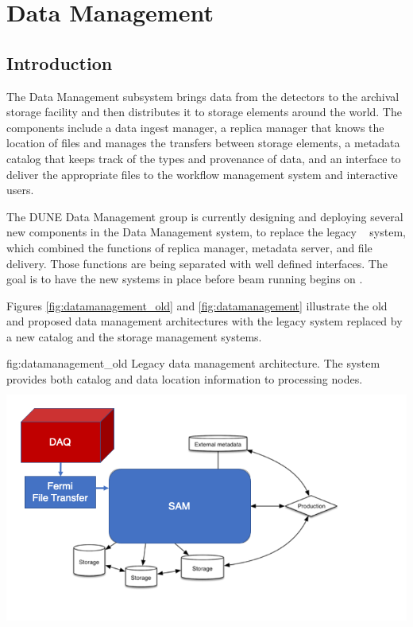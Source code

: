 \documentclass[../main-v1.tex]{subfiles}
\begin{document}
\chapter{Data Management  }
\label{ch:datamgmt}

\section{Introduction }
\label{sec:datamgmt:xyz}  %

The Data Management subsystem brings data from the detectors to the archival storage facility 
and then distributes it to storage elements around the world.  The components include a data ingest manager, a replica manager that knows the location of files and manages the transfers between storage elements, a metadata catalog that keeps track of the types and provenance of data, and an interface to deliver the appropriate files to the workflow management system and interactive users.

The DUNE Data Management group is currently designing and deploying several new components in the Data Management
system, to replace the legacy ~\cite{Illingworth:2014mba} system, which combined the functions of replica manager, metadata server, 
and file delivery.  Those functions are being separated with well defined interfaces.  The goal is to have the new systems in place before beam running begins on .

Figures \ref{fig:datamanagement_old} and \ref{fig:datamanagement} illustrate the old and proposed data management architectures with the legacy  system replaced by a new catalog and the  storage management systems. 

\begin{dunefigure}
{fig:datamanagement_old} 
{Legacy  data management architecture.  The  system provides both catalog and data location information to processing nodes.}
\includegraphics[height=8cm]{graphics/DataManagement/data_mgmt_figures_old.png}
\end{dunefigure}
\end{document}

